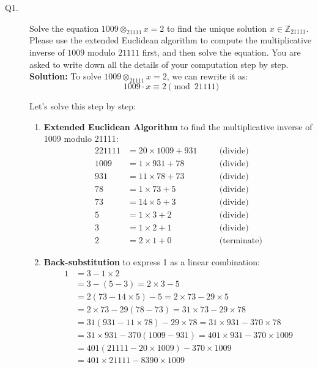 \documentclass[11pt,epsfig]{article}
\begin{document}
\begin{description}

\item[Q1.] 
Solve the equation $1009 \otimes_{21111} x=2$ to find the unique solution $x \in \mathbb{Z}_{21111}$. Please use the extended Euclidean algorithm to compute the multiplicative inverse of $1009$ modulo $21111$ first, and then solve the equation. You are asked to write down all the details of your computation step by step.    \hfill {} 
\noindent \textbf{Solution:} To solve $1009 \otimes_{21111} x=2$, we can rewrite it as:
\begin{equation}
    1009 \cdot x \equiv 2 \pmod{21111}
    \label{eq:1}
\end{equation}

Let's solve this step by step:

\begin{enumerate}
    \item \textbf{Extended Euclidean Algorithm} to find the multiplicative inverse of 1009 modulo 21111:
        \begin{alignat*}{2}
            21111 &= 20 \times 1009 + 931 & \quad &\text{(divide)} \\
            1009 &= 1 \times 931 + 78 & &\text{(divide)} \\
            931 &= 11 \times 78 + 73 & &\text{(divide)} \\
            78 &= 1 \times 73 + 5 & &\text{(divide)} \\
            73 &= 14 \times 5 + 3 & &\text{(divide)} \\
            5 &= 1 \times 3 + 2 & &\text{(divide)} \\
            3 &= 1 \times 2 + 1 & &\text{(divide)} \\
            2 &= 2 \times 1 + 0 & &\text{(terminate)}            
        \end{alignat*}

    \item \textbf{Back-substitution} to express 1 as a linear combination:
        \begin{align*}
            1 &= 3 - 1 \times 2 \\
            &= 3 - (5 - 3) = 2 \times 3 - 5 \\
            &= 2(73 - 14 \times 5) - 5 = 2 \times 73 - 29 \times 5 \\
            &= 2 \times 73 - 29(78 - 73) = 31 \times 73 - 29 \times 78 \\
            &= 31(931 - 11 \times 78) - 29 \times 78 = 31 \times 931 - 370 \times 78 \\
            &= 31 \times 931 - 370(1009 - 931) = 401 \times 931 - 370 \times 1009 \\
            &= 401(21111 - 20 \times 1009) - 370 \times 1009 \\
            &= 401 \times 21111 - 8390 \times 1009
        \end{align*}


\end{enumerate}
\end{description}
\end{document}

